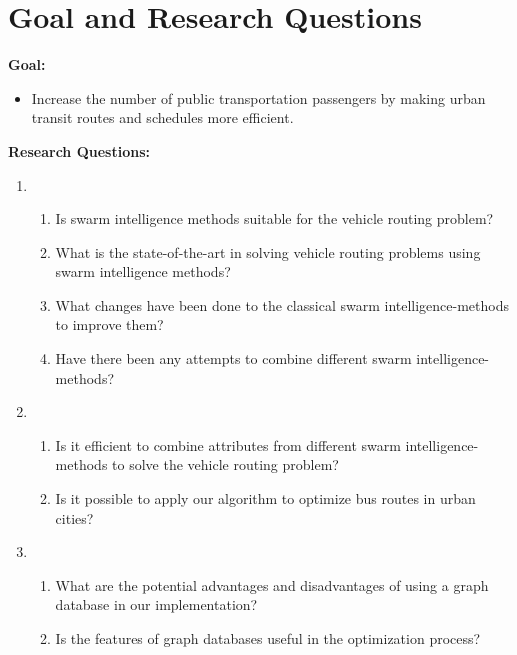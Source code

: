 \section{Goal and Research Questions}
\textbf{Goal:}
\begin{itemize}
\item \label{itm:goal} Increase the number of public transportation passengers by making urban transit routes and schedules more efficient.
\end{itemize}
\textbf{Research Questions:}
\begin{enumerate}[label=\textbf{\arabic*})]
\item 
    \begin{enumerate}
    \item Is swarm intelligence methods suitable for the vehicle routing problem?
    \item What is the state-of-the-art in solving vehicle routing problems using swarm intelligence methods?
    \item What changes have been done to the classical swarm intelligence-methods to improve them?
    \item Have there been any attempts to combine different swarm intelligence-methods?
	\end{enumerate}
\item
    \begin{enumerate}
    \item Is it efficient to combine attributes from different swarm intelligence-methods to solve the vehicle routing problem?
    \item Is it possible to apply our algorithm to optimize bus routes in urban cities?
    \end{enumerate}

\item
	\begin{enumerate}
	\item What are the potential advantages and disadvantages of using a graph database in our implementation?
	\item Is the features of graph databases useful in the optimization process? 
    \end{enumerate}
\end{enumerate}